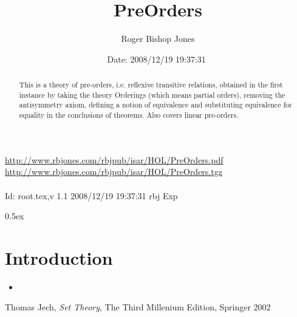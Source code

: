 \documentclass[11pt,a4paper]{article}
\begin{document}
\title{PreOrders}
\author{Roger Bishop Jones}
\date{$ $Date: 2008/12/19 19:37:31 $ $}
\maketitle

\begin{abstract}
This is a theory of pre-orders, i.e. reflexive transitive relations, obtained in the first instance by taking the theory Orderings (which means partial orders), removing the antisymmetry axiom, defining a notion of equivalence and substituting equivalence for equality in the conclusions of theorems.
Also covers linear pre-orders.
\end{abstract}

\vfill
\begin{centering}
{\footnotesize
\href{http://www.rbjones.com/rbjpub/isar/HOL/Membership.pdf}{http://www.rbjones.com/rbjpub/isar/HOL/PreOrders.pdf}\\
\href{http://www.rbjones.com/rbjpub/isar/HOL/Membership.tgz}{http://www.rbjones.com/rbjpub/isar/HOL/PreOrders.tgz}\\
\ \\
$ $Id: root.tex,v 1.1 2008/12/19 19:37:31 rbj Exp $ $\\
}%
\end{centering}

\newpage

\tableofcontents

\parindent 0pt\parskip 0.5ex

\section{Introduction}


\begin{itemize}

\item 
\end{itemize}



\begin{thebibliography}{99}

 Thomas Jech, \emph{Set Theory}, The Third Millenium Edition, Springer 2002

\end{thebibliography}
\end{document}
